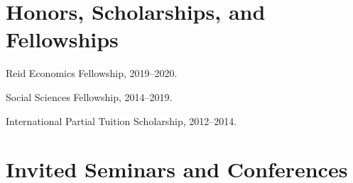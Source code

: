 \documentclass[10pt,letterpaper]{article}
\renewenvironment{itemize}{
  \begin{list}{}{
      \setlength{\leftmargin}{1.5em}
      \setlength{\itemsep}{0.25em}
      \setlength{\parskip}{0pt}
      \setlength{\parsep}{0.25em}
    }
}{
  \end{list}
}
\begin{document}
%



\section*{Honors, Scholarships, and Fellowships}

\begin{itemize}
\item Reid Economics Fellowship, 2019--2020.
\item Social Sciences Fellowship, 2014--2019.
\item International Partial Tuition Scholarship, 2012--2014.
\end{itemize}

\section*{Invited Seminars and Conferences}
\end{document}
